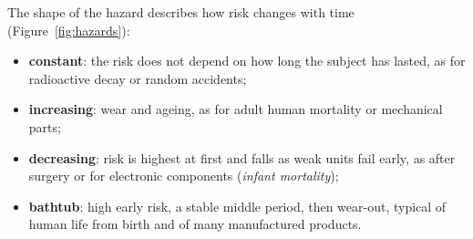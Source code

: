 \documentclass[11pt,a4paper]{article}
\numberwithin{equation}{section}
\theoremstyle{definition}
\begin{document}
The shape of the hazard describes how risk changes with time (Figure~\ref{fig:hazards}):
\begin{itemize}
\item \textbf{constant}: the risk does not depend on how long the subject has lasted, as for radioactive decay or random accidents;
\item \textbf{increasing}: wear and ageing, as for adult human mortality or mechanical parts;
\item \textbf{decreasing}: risk is highest at first and falls as weak units fail early, as after surgery or for electronic components (\emph{infant mortality});
\item \textbf{bathtub}: high early risk, a stable middle period, then wear-out, typical of human life from birth and of many manufactured products.
\end{itemize}
\end{document}
